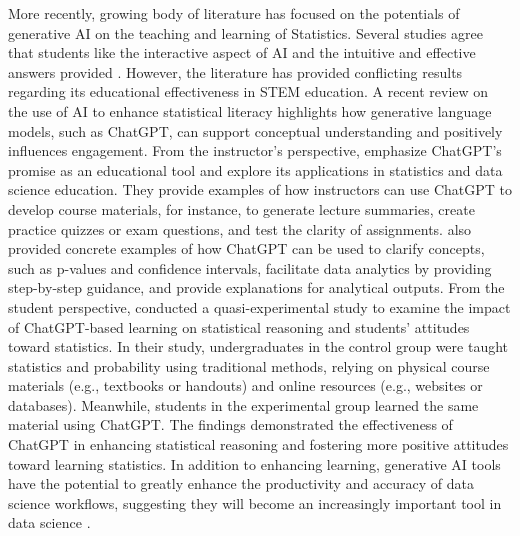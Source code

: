 \documentclass[
  12pt]{article}
\begin{document}
More recently, growing body of literature has focused on the potentials of generative AI on the teaching and learning of Statistics. 
Several studies agree that students like the interactive aspect of AI and the intuitive and effective answers provided \citep{hariyanti-et-al-2025}. However, the literature has provided conflicting results regarding its educational effectiveness in STEM education.
A recent review on the use of AI to enhance statistical literacy \citep{hariyanti-et-al-2025} highlights how generative language models, such as ChatGPT, can support conceptual understanding and positively influences engagement. 
From the instructor's perspective, \cite{ellis-slade-2023} emphasize ChatGPT’s promise as an educational tool and explore its applications in statistics and data science education. 
They provide examples of how instructors can use ChatGPT to develop course materials, for instance, to generate lecture summaries, create practice quizzes or exam questions, and test the clarity of assignments. 
\cite{pan-gu-2023} also provided concrete examples of how ChatGPT can be used to clarify concepts, such as p-values and confidence intervals, facilitate data analytics by providing step-by-step guidance, and provide explanations for analytical outputs. 
From the student perspective, \cite{wahba-et-al-2024} conducted a quasi-experimental study to examine the impact of ChatGPT-based learning on statistical reasoning and students' attitudes toward statistics. 
In their study, undergraduates in the control group were taught statistics and probability using traditional methods, relying on physical course materials (e.g., textbooks or handouts) and online resources (e.g., websites or databases). 
Meanwhile, students in the experimental group learned the same material using ChatGPT.
The findings demonstrated the effectiveness of ChatGPT in enhancing statistical reasoning and fostering more positive attitudes toward learning statistics. In addition to enhancing learning, generative AI tools have the potential to greatly enhance the productivity and accuracy of data science workflows, suggesting they will become an increasingly important tool in data science \citep{hassani-silva-2023}.
\end{document}
